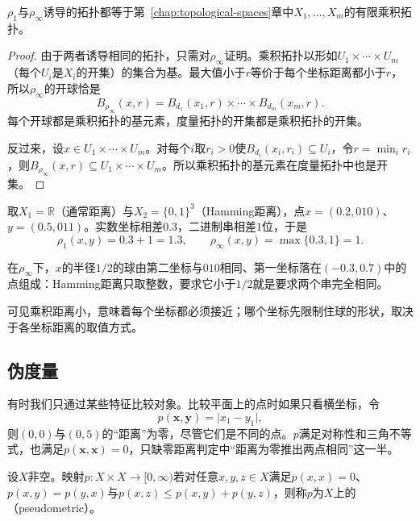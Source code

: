\begin{theorem}[乘积度量的拓扑]
\label{thm:metric-product-topology}
$\rho_1$与$\rho_\infty$诱导的拓扑都等于第~\ref{chap:topological-spaces}章中$X_1,\ldots,X_m$的有限乘积拓扑。
\end{theorem}

\begin{proof}
由于两者诱导相同的拓扑，只需对$\rho_\infty$证明。乘积拓扑以形如$U_1\times\cdots\times U_m$（每个$U_i$是$X_i$的开集）的集合为基。最大值小于$r$等价于每个坐标距离都小于$r$，所以$\rho_\infty$的开球恰是
\[
B_{\rho_\infty}(x,r)=B_{d_1}(x_1,r)\times\cdots\times B_{d_m}(x_m,r).
\]
每个开球都是乘积拓扑的基元素，度量拓扑的开集都是乘积拓扑的开集。

反过来，设$x\in U_1\times\cdots\times U_m$。对每个$i$取$r_i>0$使$B_{d_i}(x_i,r_i)\subseteq U_i$，令$r=\min_i r_i$，则$B_{\rho_\infty}(x,r)\subseteq U_1\times\cdots\times U_m$。所以乘积拓扑的基元素在度量拓扑中也是开集。
\end{proof}

\begin{example}[两类坐标的乘积]
\label{ex:metric-product-two-coordinates}
取$X_1=\mathbb R$（通常距离）与$X_2=\{0,1\}^3$（Hamming距离），点$x=(0.2,010)$、$y=(0.5,011)$。实数坐标相差$0.3$，二进制串相差$1$位，于是
\[
\rho_1(x,y)=0.3+1=1.3,\qquad\rho_\infty(x,y)=\max\{0.3,1\}=1.
\]

在$\rho_\infty$下，$x$的半径$1/2$的球由第二坐标与$010$相同、第一坐标落在$(-0.3,0.7)$中的点组成：Hamming距离只取整数，要求它小于$1/2$就是要求两个串完全相同。
\end{example}

可见乘积距离小，意味着每个坐标都必须接近；哪个坐标先限制住球的形状，取决于各坐标距离的取值方式。

\subsection{伪度量}
\label{sec:metric-pseudometric}

有时我们只通过某些特征比较对象。比较平面上的点时如果只看横坐标，令
\begin{equation}
p(\bm x,\bm y)=\lvert x_1-y_1\rvert,
\label{eq:metric-first-coordinate-pseudometric}
\end{equation}
则$(0,0)$与$(0,5)$的“距离”为零，尽管它们是不同的点。$p$满足对称性和三角不等式，也满足$p(\bm x,\bm x)=0$，只缺零距离判定中“距离为零推出两点相同”这一半。

\begin{definition}[伪度量]
\label{def:metric-pseudometric}
设$X$非空。映射$p:X\times X\to[0,\infty)$若对任意$x,y,z\in X$满足$p(x,x)=0$、$p(x,y)=p(y,x)$与$p(x,z)\leq p(x,y)+p(y,z)$，则称$p$为$X$上的（pseudometric）。
\end{definition}


